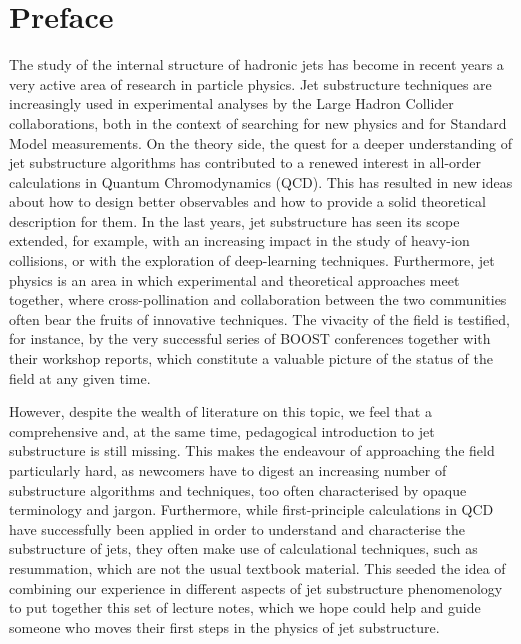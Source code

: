 \chapter*{Preface}
The study of the internal structure of hadronic jets has become in recent years a very active area of research in particle physics. Jet substructure techniques are increasingly used in experimental analyses by the Large Hadron Collider collaborations, both in the context of searching for new physics and for Standard Model measurements. 
On the theory side, the quest for a deeper understanding of jet
substructure algorithms has contributed to a renewed interest in
all-order calculations in Quantum Chromodynamics (QCD).
%
This has resulted in new ideas about how to design better observables
and how to provide a solid theoretical description for them.
%
In the last years, jet substructure has seen its scope extended, for
example, with an increasing impact in the study of heavy-ion
collisions, or with the exploration of deep-learning techniques.
%
Furthermore, jet physics is an area
in which experimental and theoretical approaches meet together, where cross-pollination and collaboration between the two communities often bear the fruits of innovative techniques.
%
The vivacity of the field is testified, for instance, by the very successful series of BOOST conferences together with their workshop reports, which constitute a valuable picture of the status of the field at any given time. 

However, despite the wealth of literature on this topic, we feel that a comprehensive and, at the same time, pedagogical introduction to jet substructure is still missing. This makes the endeavour of approaching the field particularly hard, as newcomers have to digest an increasing number of substructure algorithms and techniques, too often characterised by opaque terminology and jargon. Furthermore, while first-principle calculations in QCD have successfully been applied in order to understand and characterise the substructure of jets, they often make use of calculational techniques, such as resummation, which are not the usual textbook material.
%
This seeded the idea of combining our experience in different aspects of jet substructure phenomenology to put together this set of lecture notes, which we hope could help and guide someone who moves their first steps in the physics of jet substructure.  

\pagebreak

